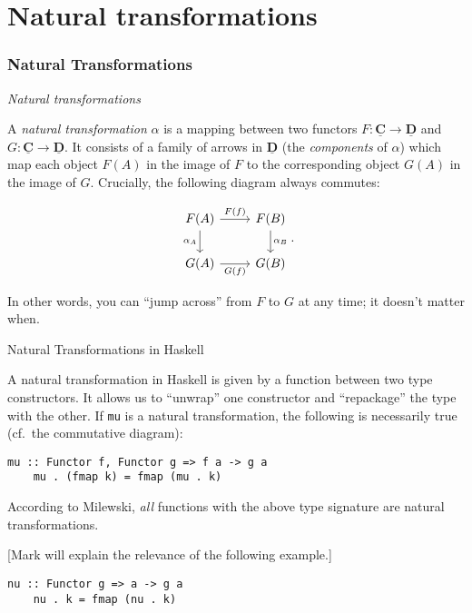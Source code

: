 \documentclass[10pt]{beamer}
\newcommand{\Cat}[1]{\ensuremath{\underline{\mathbf{#1}}}}
\theoremstyle{definition}
\theoremstyle{remark}
\numberwithin{equation}{section}
\begin{document}
\section{Natural transformations}

\begin{frame}[fragile]
  \frametitle{Natural Transformations}

  \emph{Natural transformations}

  A \emph{natural transformation} $\alpha$ is a mapping between two functors $F\colon
  \Cat{C} \rightarrow \Cat{D}$ and $G\colon \Cat{C} \rightarrow \Cat{D}$. It consists of a family of
  arrows in $\Cat{D}$ (the \emph{components} of $\alpha$) which map each object
  $F(A)$ in the image of $F$ to the corresponding object $G(A)$ in the image of
  $G$. Crucially, the following diagram always commutes:\vspace{-\baselineskip}

  \[
    \begin{tikzcd}
      F(A) \arrow[swap]{d}{\alpha_A} \arrow{r}{F(f)} & F(B) \arrow{d}{\alpha_B} \\
      G(A) \arrow[swap]{r}{G(f)} & G(B)
    \end{tikzcd}\rlap{.}
  \]

  In other words, you can ``jump across'' from $F$ to $G$ at any time; it
  doesn't matter when.
\end{frame}

\begin{frame}[fragile]{Natural Transformations in Haskell}

  A natural transformation in Haskell is given by a function between two type
  constructors. It allows us to ``unwrap'' one constructor and ``repackage'' the
  type with the other. If \lstinline{mu} is a natural transformation, the
  following is necessarily true (cf.\ the commutative diagram):
  \begin{lstlisting}[frame=single]
    mu :: Functor f, Functor g => f a -> g a
    mu . (fmap k) = fmap (mu . k)
  \end{lstlisting}

  According to Milewski, \emph{all} functions with the above type signature are
  natural transformations.

  [Mark will explain the relevance of the following example.]
  
  \begin{lstlisting}[frame=single]
    nu :: Functor g => a -> g a
    nu . k = fmap (nu . k)
  \end{lstlisting}
  
\end{frame}
\end{document}
